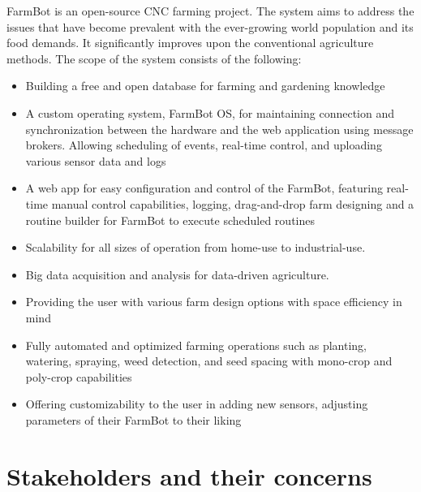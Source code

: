 FarmBot is an open-source CNC farming project. The system aims to address the issues that have become prevalent with the ever-growing world population and its food demands. It significantly improves upon the conventional agriculture methods.
The scope of the system consists of the following:
\begin{itemize}
    \item Building a free and open database for farming and gardening knowledge
    \item A custom operating system, FarmBot OS, for maintaining connection and synchronization between the hardware and the web application using message brokers. Allowing scheduling of events, real-time control, and uploading various sensor data and logs
    \item A web app for easy configuration and control of the FarmBot, featuring real-time manual control capabilities, logging, drag-and-drop farm designing and a routine builder for FarmBot to execute scheduled routines
    \item Scalability for all sizes of operation from home-use to industrial-use.
    \item Big data acquisition and analysis for data-driven agriculture.
    \item Providing the user with various farm design options with space efficiency in mind
    \item Fully automated and optimized farming operations such as planting, watering, spraying, weed detection, and seed spacing with mono-crop and poly-crop capabilities
    \item Offering customizability to the user in adding new sensors, adjusting parameters of their FarmBot to their liking
\end{itemize}

\section{Stakeholders and their concerns}

